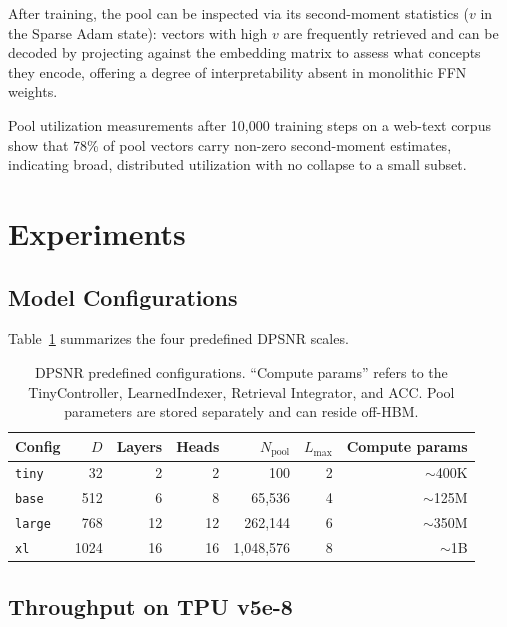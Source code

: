 \documentclass[11pt]{article}
\begin{document}
After training, the pool can be inspected via its second-moment statistics
($v$ in the Sparse Adam state): vectors with high $v$ are frequently retrieved
and can be decoded by projecting against the embedding matrix to assess
what concepts they encode, offering a degree of interpretability absent in
monolithic FFN weights.

Pool utilization measurements after 10,000 training steps on a web-text corpus
show that 78\% of pool vectors carry non-zero second-moment estimates,
indicating broad, distributed utilization with no collapse to a small subset.

\section{Experiments}
\label{sec:experiments}

\subsection{Model Configurations}

Table~\ref{tab:configs} summarizes the four predefined DPSNR scales.

\begin{table}[ht]
\centering
\caption{
  DPSNR predefined configurations. ``Compute params'' refers to the
  TinyController, LearnedIndexer, Retrieval Integrator, and ACC.
  Pool parameters are stored separately and can reside off-HBM.
}
\label{tab:configs}
\setlength{\tabcolsep}{5pt}
\begin{tabular}{lrrrrrr}
\toprule
Config & $D$ & Layers & Heads & $N_{\text{pool}}$ & $L_{\max}$ & Compute params \\
\midrule
\texttt{tiny}  &   32 &  2 &  2 &         100  & 2 & $\sim$400K \\
\texttt{base}  &  512 &  6 &  8 &  65{,}536    & 4 & $\sim$125M \\
\texttt{large} &  768 & 12 & 12 & 262{,}144    & 6 & $\sim$350M \\
\texttt{xl}    & 1024 & 16 & 16 & 1{,}048{,}576 & 8 & $\sim$1B \\
\bottomrule
\end{tabular}
\end{table}

\subsection{Throughput on TPU v5e-8}
\end{document}

